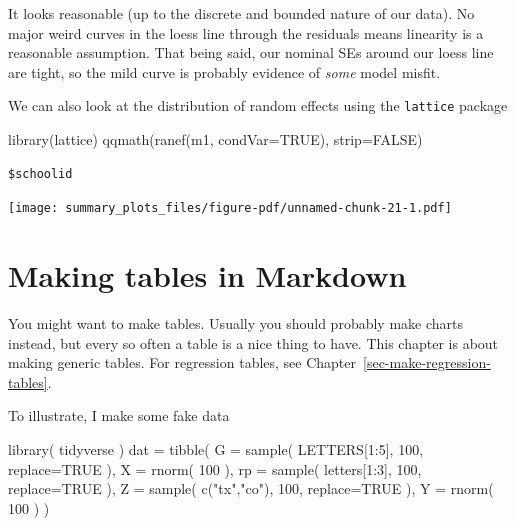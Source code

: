 \documentclass[
  letterpaper,
  DIV=11,
  numbers=noendperiod]{scrreprt}
\newenvironment{Shaded}{}{}
\newcommand{\AttributeTok}[1]{\textcolor[rgb]{0.49,0.56,0.16}{#1}}
\newcommand{\ConstantTok}[1]{\textcolor[rgb]{0.53,0.00,0.00}{#1}}
\newcommand{\DecValTok}[1]{\textcolor[rgb]{0.25,0.63,0.44}{#1}}
\newcommand{\FunctionTok}[1]{\textcolor[rgb]{0.02,0.16,0.49}{#1}}
\newcommand{\NormalTok}[1]{#1}
\newcommand{\OtherTok}[1]{\textcolor[rgb]{0.00,0.44,0.13}{#1}}
\newcommand{\SpecialCharTok}[1]{\textcolor[rgb]{0.25,0.44,0.63}{#1}}
\newcommand{\StringTok}[1]{\textcolor[rgb]{0.25,0.44,0.63}{#1}}
\begin{document}
It looks reasonable (up to the discrete and bounded nature of our data).
No major weird curves in the loess line through the residuals means
linearity is a reasonable assumption. That being said, our nominal SEs
around our loess line are tight, so the mild curve is probably evidence
of \emph{some} model misfit.

We can also look at the distribution of random effects using the
\texttt{lattice} package

\begin{Shaded}
\begin{Highlighting}[]
  \FunctionTok{library}\NormalTok{(lattice)}
  \FunctionTok{qqmath}\NormalTok{(}\FunctionTok{ranef}\NormalTok{(m1, }\AttributeTok{condVar=}\ConstantTok{TRUE}\NormalTok{), }\AttributeTok{strip=}\ConstantTok{FALSE}\NormalTok{)}
\end{Highlighting}
\end{Shaded}

\begin{verbatim}
$schoolid
\end{verbatim}

\texttt{[image: summary\_plots\_files/figure-pdf/unnamed-chunk-21-1.pdf]}

\chapter{Making tables in Markdown}\label{sec-make-tables}

You might want to make tables. Usually you should probably make charts
instead, but every so often a table is a nice thing to have. This
chapter is about making generic tables. For regression tables, see
Chapter~\ref{sec-make-regression-tables}.

To illustrate, I make some fake data

\begin{Shaded}
\begin{Highlighting}[]
\FunctionTok{library}\NormalTok{( tidyverse )}
\NormalTok{dat }\OtherTok{=} \FunctionTok{tibble}\NormalTok{( }\AttributeTok{G =} \FunctionTok{sample}\NormalTok{( LETTERS[}\DecValTok{1}\SpecialCharTok{:}\DecValTok{5}\NormalTok{], }\DecValTok{100}\NormalTok{, }\AttributeTok{replace=}\ConstantTok{TRUE}\NormalTok{ ),}
              \AttributeTok{X =} \FunctionTok{rnorm}\NormalTok{( }\DecValTok{100}\NormalTok{ ),}
              \AttributeTok{rp =} \FunctionTok{sample}\NormalTok{( letters[}\DecValTok{1}\SpecialCharTok{:}\DecValTok{3}\NormalTok{], }\DecValTok{100}\NormalTok{, }\AttributeTok{replace=}\ConstantTok{TRUE}\NormalTok{ ),}
              \AttributeTok{Z =} \FunctionTok{sample}\NormalTok{( }\FunctionTok{c}\NormalTok{(}\StringTok{"tx"}\NormalTok{,}\StringTok{"co"}\NormalTok{), }\DecValTok{100}\NormalTok{, }\AttributeTok{replace=}\ConstantTok{TRUE}\NormalTok{ ),}
              \AttributeTok{Y =} \FunctionTok{rnorm}\NormalTok{( }\DecValTok{100}\NormalTok{ ) )}
\end{Highlighting}
\end{Shaded}
\end{document}
